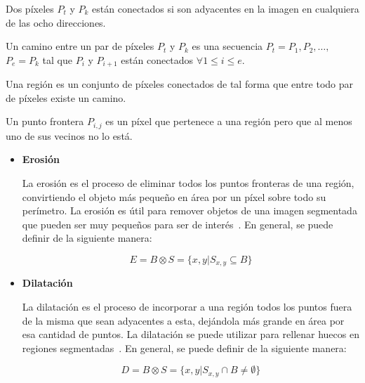 \begin{definition}
	Dos píxeles $P_t$ y $P_k$ están conectados si son adyacentes en la imagen en cualquiera de las ocho direcciones.
\end{definition}

\begin{definition}
	Un camino entre un par de píxeles $P_t$ y $P_k$ es una secuencia $P_t = P_1, P_2, \ldots,$ $P_e = P_k$ tal que $P_i$ y $P_{i + 1}$ están conectados $\forall 1 \leq i \leq e$.
\end{definition}

\begin{definition}
	Una región es un conjunto de píxeles conectados de tal forma que entre todo par de píxeles existe un camino.
\end{definition}

\begin{definition}
	Un punto frontera $P_{i, j}$ es un píxel que pertenece a una región pero que al menos uno de sus vecinos no lo está.
\end{definition}

\begin{itemize}
	\item \textbf{Erosión}
	
	La erosión es el proceso de eliminar todos los puntos fronteras de una región, convirtiendo el objeto más pequeño en área por un píxel sobre todo su perímetro. La erosión es útil para remover objetos de una imagen segmentada que pueden ser muy pequeños para ser de interés~\cite{castleman1996digital}. En general, se puede definir de la siguiente manera:
	
	\begin{equation}
		E = B \otimes S = \{x, y | S_{x, y} \subseteq B\}
	\end{equation}

	\item \textbf{Dilatación}
	
	La dilatación es el proceso de incorporar a una región todos los puntos fuera de la misma que sean adyacentes a esta, dejándola más grande en área por esa cantidad de puntos. La dilatación se puede utilizar para rellenar huecos en regiones segmentadas~\cite{castleman1996digital}. En general, se puede definir de la siguiente manera:
	
	\begin{equation}
		D = B \otimes S = \{x, y | S_{x, y} \cap B \neq \emptyset\}
	\end{equation}
\end{itemize}

